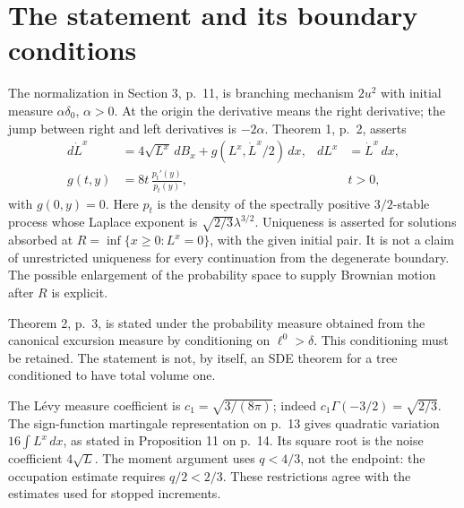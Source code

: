 \documentclass[10pt]{article}
\begin{document}
\section*{The statement and its boundary conditions}
The normalization in Section 3, p. 11, is branching mechanism \(2u^2\) with initial measure \(\alpha\delta_0\), \(\alpha>0\). At the origin the derivative means the right derivative; the jump between right and left derivatives is \(-2\alpha\). Theorem 1, p. 2, asserts \[\begin{aligned}
 d\dot L^x&=4\sqrt{L^x}\,dB_x+
       g(L^x,\dot L^x/2)\,dx,& dL^x&=\dot L^x\,dx,\\
 g(t,y)&=8t\,\frac{p_t'(y)}{p_t(y)},&&t>0,\end{aligned}\] with \(g(0,y)=0\). Here \(p_t\) is the density of the spectrally positive \(3/2\)-stable process whose Laplace exponent is \(\sqrt{2/3}\lambda^{3/2}\). Uniqueness is asserted for solutions absorbed at \(R=\inf\{x\geq0:L^x=0\}\), with the given initial pair. It is not a claim of unrestricted uniqueness for every continuation from the degenerate boundary. The possible enlargement of the probability space to supply Brownian motion after \(R\) is explicit.\par
Theorem 2, p. 3, is stated under the probability measure obtained from the canonical excursion measure by conditioning on \(\ell^0>\delta\). This conditioning must be retained. The statement is not, by itself, an SDE theorem for a tree conditioned to have total volume one.\par
The Lévy measure coefficient is \(c_1=\sqrt{3/(8\pi)}\); indeed \(c_1\Gamma(-3/2)=\sqrt{2/3}\). The sign-function martingale representation on p. 13 gives quadratic variation \(16\int L^x\,dx\), as stated in Proposition 11 on p. 14. Its square root is the noise coefficient \(4\sqrt L\). The moment argument uses \(q<4/3\), not the endpoint: the occupation estimate requires \(q/2<2/3\). These restrictions agree with the estimates used for stopped increments.\par
\end{document}

